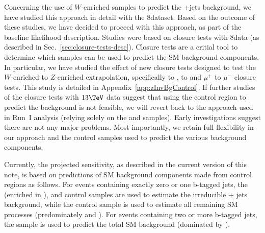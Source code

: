 Concerning the use of $W$-enriched samples to predict the \znunu +jets
background, we have studied this approach
in detail with the 8\TeV dataset. Based on the outcome of these studies,
we have decided to proceed with this approach, as part
of the baseline likelihood description. Studies were
based on closure tests with 8\TeV data
(as described in Sec.~\ref{sec:closure-tests-desc}). Closure tests are a critial
tool to determine which samples can be used to predict the SM
background components. In particular, we have studied the effect of
new closure tests designed to test the $W$-enriched to $Z$-enriched
extrapolation, specifically \mj to \gj, \mj to \mmj
and $\mu^{+}$ to $\mu^{-}$ closure tests. This study is detailed in Appendix~\ref{app:zInvBgControl}.
If further studies of the closure tests with $13\tev$
data suggest that using the \mj control region to predict the \znunu
background is not feasible, we will revert back to the approach
used in Run~I analysis (\ie relying solely on the \zll and \gj
samples). Early investigations suggest there are not any major problems.
Most importantly, we retain full flexibility in our approach and the
control samples used to predict the various background components.

Currently, the projected sensitivity, as described in the current
version of this note, is based on predictions of SM background
components made from control regions as follows. For events containing
exactly zero or one b-tagged jets, the \mj (enriched in \wej), \gj and
\mmj control samples are used to estimate the irreducible \znunu + jets
background, while the \mj control sample is used to estimate all
remaining SM processes (predominately \wj and \ttbar). For events
containing two or more b-tagged jets, the \mj sample is
used to predict the total SM background (dominated by \ttbar).

